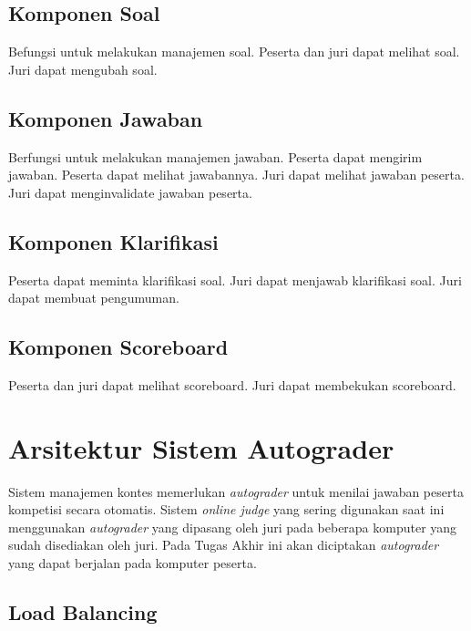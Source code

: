 \subsection{Komponen Soal}

\par Befungsi untuk melakukan manajemen soal. Peserta dan juri dapat melihat soal. Juri dapat mengubah soal.

\subsection{Komponen Jawaban}

\par Berfungsi untuk melakukan manajemen jawaban. Peserta dapat mengirim jawaban. Peserta dapat melihat jawabannya. Juri dapat melihat jawaban peserta. Juri dapat menginvalidate jawaban peserta.

\subsection{Komponen Klarifikasi}

\par Peserta dapat meminta klarifikasi soal. Juri dapat menjawab klarifikasi soal. Juri dapat membuat pengumuman.

\subsection{Komponen Scoreboard}

\par Peserta dan juri dapat melihat scoreboard. Juri dapat membekukan scoreboard.

\section{Arsitektur Sistem Autograder}

\par Sistem manajemen kontes memerlukan \textit{autograder} untuk menilai jawaban peserta kompetisi secara otomatis. Sistem \textit{online judge} yang sering digunakan saat ini menggunakan \textit{autograder} yang dipasang oleh juri pada beberapa komputer yang sudah disediakan oleh juri. Pada Tugas Akhir ini akan diciptakan \textit{autograder} yang dapat berjalan pada komputer peserta.

\subsection{Load Balancing}


